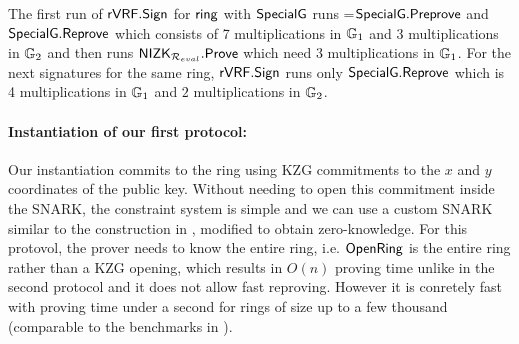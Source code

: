 The first run of ${\mathsf{rVRF}}.{\mathsf{Sign}}$ for $\mathsf{ring}$ with $ {\mathsf{SpecialG}} $ runs =${\mathsf{SpecialG}}.{\mathsf{Preprove}}$ and $ {\mathsf{SpecialG}}.{\mathsf{Reprove}}$ which consists of  7 multiplications in $\mathbb{G}_1 $ and $3$ multiplications in $\mathbb{G}_2$ and then runs ${\mathsf{NIZK}}_{\mathcal{R}_{eval}}.{\mathsf{Prove}}$ which need  3 multiplications in $ \mathbb{G}_1 $.
For the next signatures for the same ring,  ${\mathsf{rVRF}}.{\mathsf{Sign}}$  runs only  ${\mathsf{SpecialG}}.{\mathsf{Reprove}}$ which is 4 multiplications in $\mathbb{G}_1 $ and $2$ multiplications in $\mathbb{G}_2$.



\paragraph{Instantiation of our first protocol:}  Our instantiation commits to the ring using KZG commitments to the $ x $ and $ y $ coordinates of the public key. Without needing to open this commitment inside the SNARK, the constraint system is simple and we can use a custom SNARK similar to the construction in \cite{accountable}, modified to obtain zero-knowledge.  For this protovol, the prover needs to know the entire ring, i.e. ${\mathsf{OpenRing}}$ is the entire ring rather than a KZG opening, which results in $O(n)$ proving time unlike in the second protocol and it does not allow fast reproving. However it is conretely fast with proving time under a second for rings of size up to a few thousand (comparable to the benchmarks in \cite{accountable}).  
